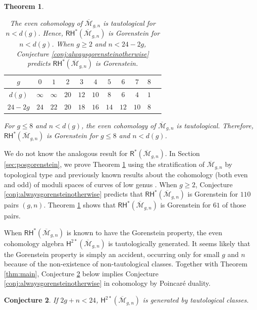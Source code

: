 \documentclass[12pt]{amsart}
\newtheorem{thm}{Theorem}
\newtheorem{conj}[thm]{Conjecture}
\theoremstyle{definition}
\renewcommand{\H}{\mathsf{H}}
\newcommand{\R}{\mathsf{R}}
\newcommand{\RH}{\mathsf{RH}}
\newcommand{\M}{\mathcal{M}}
\newcommand{\Mb}{\overline{\M}}
\begin{document}
\begin{thm}\label{thm:positivegorenstein}
\begin{table}[h!]
\centering
\begin{tabular}{|c|c|c|c|c|c|c|c|c|c|c|} 
 \hline
 $g$ & $0$ & $1$ & $2$ & $3$ & $4$ & $5$ & $6$ & $7$ & $8$ \\
 \hline
 $d(g)$ & $\infty$ & $\infty$ & $20$ & $12$ & $10$ & $8$ & $6$ & $4$ & $1$  \\ 
\hline
$24-2g$ & $24$ & $22$ & $20$ & $18$ & $16$ & $14$ & $12$ & $10$ & $8$ \\
\hline
\end{tabular}
\vspace{.1in}
\caption{The even cohomology of $\Mb_{g,n}$ is tautological for $n< d(g)$. Hence, $\RH^*(\Mb_{g,n})$ is Gorenstein for $n <d(g)$. When $g\geq 2$ and $n<24-2g$, Conjecture \ref{conj:alwaysgorensteinotherwise} predicts $\RH^*(\Mb_{g,n})$ is Gorenstein.}
\label{ckgptable2}
\end{table}
For $g\leq 8$ and $n< d(g)$, the even cohomology of $\Mb_{g,n}$ is tautological. Therefore, $\RH^*(\Mb_{g,n})$ is Gorenstein for $g\leq 8$ and $n<d(g)$. 
\end{thm}
\noindent We do not know the analogous result for $\R^*(\Mb_{g,n})$. In Section \ref{sec:posgorenstein}, we prove Theorem \ref{thm:positivegorenstein} using the stratification of $\Mb_{g,n}$ by topological type and previously known results about the cohomology (both even and odd) of moduli spaces of curves of low genus \cite{CL-CKgP, CLP11, CLP-ste}. When $g\geq 2$, Conjecture \ref{conj:alwaysgorensteinotherwise} predicts that $\RH^*(\Mb_{g,n})$ is Gorenstein for $110$ pairs $(g,n)$. Theorem \ref{thm:positivegorenstein} shows that $\RH^*(\Mb_{g,n})$ is Gorenstein for $61$ of those pairs.

When $\RH^*(\Mb_{g,n})$ is known to have the Gorenstein property, the even cohomology algebra $\H^{2*}(\Mb_{g,n})$ is tautologically generated. It seems likely that the Gorenstein property is simply an accident, occurring only for small $g$ and $n$ because of the non-existence of non-tautological classes. Together with Theorem \ref{thm:main}, Conjecture \ref{alltaut} below implies Conjecture \ref{conj:alwaysgorensteinotherwise} in cohomology by Poincar\'e duality.
\begin{conj}\label{alltaut}
    If $2g+n<24$, $\H^{2*}(\Mb_{g,n})$ is generated by tautological classes.
\end{conj}
\end{document}

